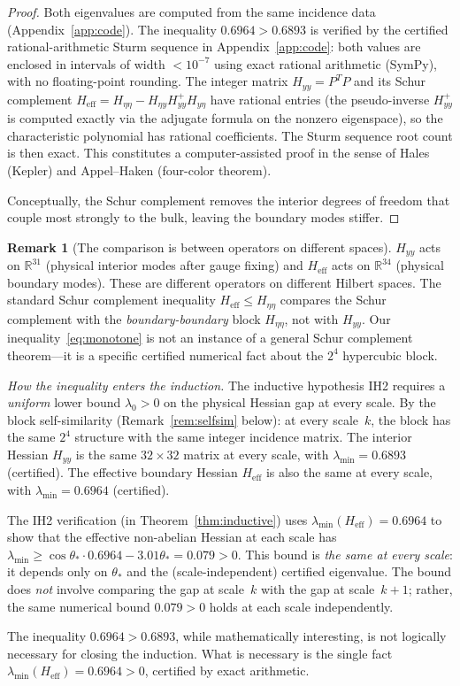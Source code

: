 \documentclass[11pt]{article}
\theoremstyle{definition}
\newtheorem{remark}[theorem]{Remark}
\newcommand{\R}{\mathbb{R}}
\begin{document}
\begin{proof}
Both eigenvalues are computed from the same incidence data
(Appendix~\ref{app:code}).  The inequality $0.6964>0.6893$ is verified
by the certified rational-arithmetic Sturm sequence in
Appendix~\ref{app:code}: both values are enclosed in intervals of
width $<10^{-7}$ using exact rational arithmetic (SymPy), with no
floating-point rounding.  The integer matrix $H_{yy}=P^TP$ and
its Schur complement $H_{\mathrm{eff}}
=H_{\eta\eta}-H_{\eta y}H_{yy}^+H_{y\eta}$ have rational entries
(the pseudo-inverse $H_{yy}^+$ is computed exactly via the adjugate
formula on the nonzero eigenspace), so the characteristic polynomial
has rational coefficients.  The Sturm sequence root count is then
exact.  This constitutes a computer-assisted proof in the sense of
Hales (Kepler) and Appel--Haken (four-color theorem).

Conceptually, the Schur complement removes the interior
degrees of freedom that couple most strongly to the bulk, leaving the
boundary modes stiffer.
\end{proof}

\begin{remark}[The comparison is between operators on different
spaces]\label{rem:monotone-spaces}
$H_{yy}$ acts on $\R^{31}$ (physical interior modes after gauge
fixing) and $H_{\mathrm{eff}}$ acts on $\R^{34}$ (physical boundary
modes).  These are different operators on different Hilbert spaces.
The standard Schur complement inequality
$H_{\mathrm{eff}}\le H_{\eta\eta}$ compares the Schur complement with
the \emph{boundary-boundary} block $H_{\eta\eta}$, not with $H_{yy}$.
Our inequality~\eqref{eq:monotone} is not an instance of a general
Schur complement theorem---it is a specific certified numerical fact
about the $2^4$ hypercubic block.

\emph{How the inequality enters the induction.}
The inductive hypothesis IH2 requires a \emph{uniform} lower bound
$\lambda_0>0$ on the physical Hessian gap at every scale.  By the
block self-similarity (Remark~\ref{rem:selfsim} below): at
every scale~$k$, the block has the same $2^4$ structure with the same
integer incidence matrix.  The interior Hessian $H_{yy}$ is the same
$32\times 32$ matrix at every scale, with
$\lambda_{\min}=0.6893$ (certified).
The effective boundary Hessian $H_{\mathrm{eff}}$ is also the same at
every scale, with $\lambda_{\min}=0.6964$ (certified).

The IH2 verification (in Theorem~\ref{thm:inductive}) uses
$\lambda_{\min}(H_{\mathrm{eff}})=0.6964$ to show that the
effective non-abelian Hessian at each scale has
$\lambda_{\min}\ge\cos\theta_*\cdot 0.6964-3.01\theta_*=0.079>0$.
This bound is \emph{the same at every scale}:
it depends only on $\theta_*$ and the (scale-independent) certified
eigenvalue.  The bound does \emph{not} involve comparing the gap at
scale~$k$ with the gap at scale~$k+1$; rather, the same
numerical bound $0.079>0$ holds at each scale independently.

The inequality $0.6964>0.6893$, while mathematically
interesting, is not logically necessary for closing the induction.
What is necessary is the single fact
$\lambda_{\min}(H_{\mathrm{eff}})=0.6964>0$, certified by
exact arithmetic.
\end{remark}
\end{document}
